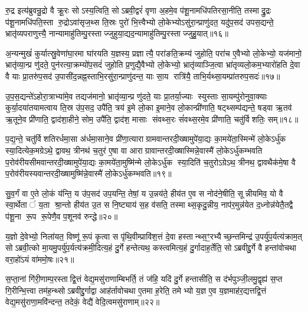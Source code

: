 रु॒द्र इत्य॑ब्रुवन्रु॒द्रो वै क्रू॒रः सोऽस्य॒त्विति॒ सोऽब्रवी॒द्वरं॑ वृणा अ॒हमे॒व प॑शू॒नामधि॑पतिरसा॒नीति॒ तस्माद्रु॒द्रः प॑शू॒नामधि॑पति॒स्ता रु॒द्रोऽवा॑सृज॒थ्स ति॒स्रः पुरो॑ भि॒त्त्वैभ्यो लो॒केभ्योऽसु॑रा॒न्प्राणु॑दत॒ यदु॑प॒सद॑ उपस॒द्यन्ते॒ भ्रातृ॑व्यपराणुत्त्यै॒ नान्यामाहु॑तिम्पु॒रस्ताज्जुहुया॒द्यद॒न्यामाहु॑तिम्पु॒रस्ताज्जुहु॒यात्॥१६॥

अ॒न्यन्मुखं॑ कुर्यात्स्रु॒वेणा॑घा॒रमा घा॑रयति य॒ज्ञस्य॒ प्रज्ञात्यै॒ परा॑ङति॒क्रम्य॑ जुहोति॒ परा॑च ए॒वैभ्यो लो॒केभ्यो॒ यज॑मानो॒ भ्रातृ॑व्या॒न्प्र णु॑दते॒ पुन॑रत्या॒क्रम्यो॑प॒सदं॑ जुहोति प्र॒णुद्यै॒वैभ्यो लो॒केभ्यो॒ भ्रातृ॑व्याञ्जि॒त्वा भ्रा॑तृव्यलो॒कम॒भ्यारो॑हति दे॒वा वै याः प्रा॒तरु॑प॒सद॑ उ॒पासी॑द॒न्नह्न॒स्ताभि॒रसु॑रा॒न्प्राणु॑दन्त॒ याः सा॒य रात्रि॑यै॒ ताभि॒र्यथ्सा॒यम्प्रा॑तरुप॒सदः॑॥१७॥

उ॒प॒स॒द्यन्ते॑ऽहोरा॒त्राभ्या॑मे॒व तद्यज॑मानो॒ भ्रातृ॑व्या॒न्प्र णु॑दते॒ याः प्रा॒तर्या॒ज्याः स्युस्ताः सा॒यम्पु॑रोनुवा॒क्याः कुर्या॒दया॑तयामत्वाय ति॒स्र उ॑प॒सद॒ उपै॑ति॒ त्रय॑ इ॒मे लो॒का इ॒माने॒व लो॒कान्प्री॑णाति॒ षट्थ्सम्प॑द्यन्ते॒ षड्वा ऋ॒तव॑ ऋ॒तूने॒व प्री॑णाति॒ द्वाद॑शा॒हीने॒ सोम॒ उपै॑ति॒ द्वाद॑श॒ मासाः संवथ्स॒रः सं॑वथ्स॒रमे॒व प्री॑णाति॒ चतु॑र्विशतिः॒ सम्॥१८॥

प॒द्य॒न्ते॒ चतु॑र्विशतिरर्धमा॒सा अ॑र्धमा॒साने॒व प्री॑णा॒त्याराग्रामवान्तरदी॒ख्षामुपे॑या॒द्यः का॒मये॑ता॒स्मिन्मे॑ लो॒केऽर्धु॑क स्या॒दित्येक॒मग्रेऽथे॒ द्वावथ॒ त्रीनथ॑ च॒तुर॑ ए॒षा वा आराग्रावान्तरदी॒ख्षास्मिन्ने॒वास्मै॑ लो॒केऽर्धु॑कम्भवति प॒रोव॑रीयसीमवान्तरदी॒ख्षामुपे॑या॒द्यः का॒मये॑ता॒मुष्मि॑न्मे लो॒केऽर्धु॑क स्या॒दिति॑ च॒तुरोऽग्रेऽथ॒ त्रीनथ॒ द्वावथैक॑मे॒षा वै प॒रोव॑रीयस्यवान्तरदी॒ख्षामुष्मि॑न्ने॒वास्मै॑ लो॒केऽर्धु॑कम्भवति॥१९॥

{\anuvakamend[{अ॒सि॒ष्य॒तीति॑ जुहु॒याथ्सा॒यम्प्रा॑तरुप॒सद॒श्चतु॑र्विशति॒स्सञ्च॒तुरोऽग्रे॒ षोड॑श च॥३॥}]}

सु॒व॒र्गं वा ए॒ते लो॒कं य॑न्ति॒ य उ॑प॒सद॑ उप॒यन्ति॒ तेषां॒ य उ॒न्नय॑ते॒ हीय॑त ए॒व स नोद॑ने॒षीति॒ सून्नीयमिव॒ यो वै स्वा॒र्थेतां य॒ता श्रा॒न्तो हीय॑त उ॒त स नि॒ष्ट्याय॑ स॒ह व॑सति॒ तस्माथ्स॒कृदु॒न्नीय॒ नाप॑र॒मुन्न॑येत द॒ध्नोन्न॑येतै॒तद्वै प॑शू॒ना रू॒प रू॒पेणै॒व प॒शूनव॑ रुन्द्धे॥२०॥

य॒ज्ञो दे॒वेभ्यो॒ निला॑यत॒ विष्णू॑ रू॒पं कृ॒त्वा स पृ॑थि॒वीम्प्रावि॑श॒त्तं दे॒वा हस्तान्थ्स॒ꣳ॒रभ्यैच्छ॒न्तमिन्द्र॑ उ॒पर्यु॑प॒र्यत्य॑क्राम॒त् सोऽब्रवी॒त्को मा॒यमु॒पर्यु॑प॒र्यत्य॑क्रमी॒दित्य॒हं दु॒र्गे हन्तेत्यथ॒ कस्त्वमित्य॒हं दु॒र्गादाह॒र्तेति॒ सोऽब्रवीद्दु॒र्गे वै हन्ता॑वोचथा वरा॒हो॑ऽयं वा॑ममो॒षः॥२१॥

स॒प्ता॒नां गि॑री॒णाम्प॒रस्ताद्वि॒त्तं वेद्य॒मसु॑राणाम्बिभर्ति॒ तं ज॑हि॒ यदि॑ दु॒र्गे हन्तासीति॒ स द॑र्भपुञ्जी॒लमु॒द्वृह्य॑ स॒प्त गि॒रीन्भि॒त्त्वा तम॑ह॒न्थ्सोऽब्रवीद्दु॒र्गाद्वा आह॑र्तावोचथा ए॒तमा ह॒रेति॒ तमेभ्यो य॒ज्ञ ए॒व य॒ज्ञमाह॑र॒द्यत्तद्वि॒त्तं वेद्य॒मसु॑राणा॒मवि॑न्दन्त॒ तदेकं॒ वेद्यै॑ वेदि॒त्वमसु॑राणाम्॥२२॥

